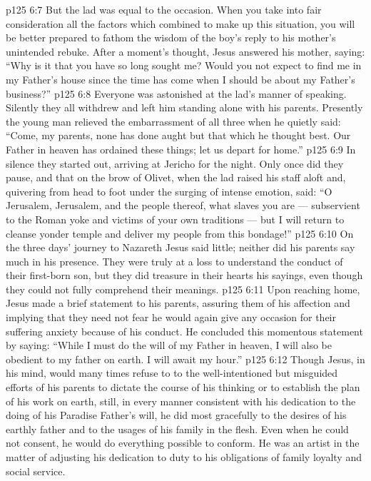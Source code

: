 \vs p125 6:7 But the lad was equal to the occasion. When you take into fair consideration all the factors which combined to make up this situation, you will be better prepared to fathom the wisdom of the boy’s reply to his mother’s unintended rebuke. After a moment’s thought, Jesus answered his mother, saying: \textcolor{ubdarkred}{“Why is it that you have so long sought me? Would you not expect to find me in my Father’s house since the time has come when I should be about my Father’s business?”}
\vs p125 6:8 Everyone was astonished at the lad’s manner of speaking. Silently they all withdrew and left him standing alone with his parents. Presently the young man relieved the embarrassment of all three when he quietly said: \textcolor{ubdarkred}{“Come, my parents, none has done aught but that which he thought best. Our Father in heaven has ordained these things; let us depart for home.”}
\vs p125 6:9 In silence they started out, arriving at Jericho for the night. Only once did they pause, and that on the brow of Olivet, when the lad raised his staff aloft and, quivering from head to foot under the surging of intense emotion, said: \textcolor{ubdarkred}{“O Jerusalem, Jerusalem, and the people thereof, what slaves you are --- subservient to the Roman yoke and victims of your own traditions --- but I will return to cleanse yonder temple and deliver my people from this bondage!”}
\vs p125 6:10 On the three days’ journey to Nazareth Jesus said little; neither did his parents say much in his presence. They were truly at a loss to understand the conduct of their first\hyp{}born son, but they did treasure in their hearts his sayings, even though they could not fully comprehend their meanings.
\vs p125 6:11 Upon reaching home, Jesus made a brief statement to his parents, assuring them of his affection and implying that they need not fear he would again give any occasion for their suffering anxiety because of his conduct. He concluded this momentous statement by saying: \textcolor{ubdarkred}{“While I must do the will of my Father in heaven, I will also be obedient to my father on earth. I will await my hour.”}
\vs p125 6:12 \pc Though Jesus, in his mind, would many times refuse to  to the well\hyp{}intentioned but misguided efforts of his parents to dictate the course of his thinking or to establish the plan of his work on earth, still, in every manner consistent with his dedication to the doing of his Paradise Father’s will, he did most gracefully  to the desires of his earthly father and to the usages of his family in the flesh. Even when he could not consent, he would do everything possible to conform. He was an artist in the matter of adjusting his dedication to duty to his obligations of family loyalty and social service.
